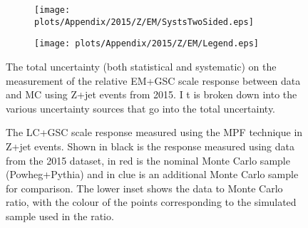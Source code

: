 \begin{figure}[!ht]
\captionsetup[subfigure]{labelformat=empty}
 \begin{center}
   \begin{subfigure}{0.5\textwidth}
     \hspace{-3cm}
     \texttt{[image: plots/Appendix/2015/Z/EM/SystsTwoSided.eps]}
   \end{subfigure}
   \begin{subfigure}{0.5\textwidth}
     \hspace{-3cm}
     \texttt{[image: plots/Appendix/2015/Z/EM/Legend.eps]}
   \end{subfigure}
 \end{center}
 \caption[Uncertainty on the EM+GSC scale response measurement using Z+jet]
 {\small The total uncertainty (both statistical and systematic) on the measurement of the relative EM+GSC scale response between data and MC using Z+jet events from 2015.  I
t is broken down into the various uncertainty sources that go into the total uncertainty.  }
 \label{Fig:ZJetSystsEM2015}
\end{figure}


\begin{figure}[!ht]
  \begin{center}
  \end{center}
  \caption[LC scale response using Z+jet in 2015]
  {\small The LC+GSC scale response measured using the MPF technique in Z+jet events.  Shown in black is the response measured using data from the 2015 dataset, in red is the nominal Monte Carlo sample (Powheg+Pythia) and in clue is an additional Monte Carlo sample for comparison.  The lower inset shows the data to Monte Carlo ratio, with the colour of the points corresponding to the simulated sample used in the ratio.  }
  \label{plot:ZJetLC2015App}
\end{figure}


